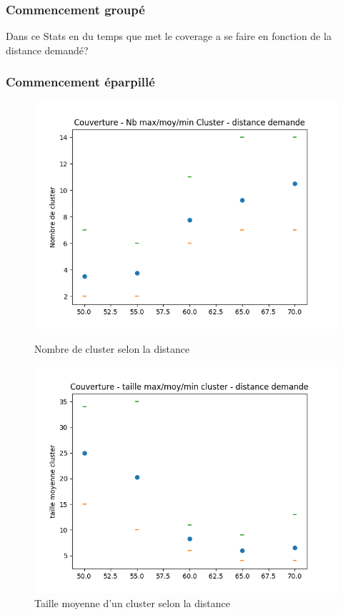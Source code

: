 \documentclass[a4paper]{article}
\begin{document}
\subsubsection{Commencement groupé}
Dans ce 
Stats en du temps que met le coverage a se faire en fonction de la distance demandé?
\subsubsection{Commencement éparpillé}
\begin{figure}[h]
	\begin{minipage}[c]{.46\linewidth}
		\centering
		\includegraphics[width=1.1\linewidth]{../../script_results/Couverture_average_robot.png}
		\caption{Nombre de cluster selon la distance}
	\end{minipage}
	\hfill%
	\begin{minipage}[c]{.46\linewidth}
		\centering
		\includegraphics[width=1.1\linewidth]{../../script_results/Couverture_taille_cluster.png}
		\caption{Taille moyenne d'un cluster selon la distance}
	\end{minipage}
\end{figure}
\end{document}
